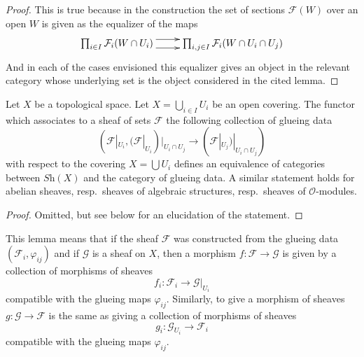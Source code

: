 \begin{proof}
This is true because in the construction the set of sections
$\mathcal{F}(W)$ over an open $W$ is given as the
equalizer of the maps
$$
\xymatrix{
\prod_{i \in I} \mathcal{F}_i(W \cap U_i)
\ar@<1ex>[r]
\ar@<-1ex>[r]
&
\prod_{i, j\in I} \mathcal{F}_i(W \cap U_i \cap U_j)
}
$$
And in each of the cases envisioned this equalizer gives
an object in the relevant category whose underlying set is
the object considered in the cited lemma.
\end{proof}

\begin{lemma}
\label{lemma-mapping-property-glue}
Let $X$ be a topological space.
Let $X = \bigcup_{i\in I} U_i$ be an open covering.
The functor which associates to a sheaf of
sets $\mathcal{F}$ the following collection of
glueing data
$$
(\mathcal{F}|_{U_i},
(\mathcal{F}|_{U_i})|_{U_i \cap U_j}
\to
(\mathcal{F}|_{U_j})|_{U_i \cap U_j}
)
$$
with respect to the covering $X = \bigcup U_i$
defines an equivalence of categories between
$\textit{Sh}(X)$ and the category of glueing
data. A similar statement holds for
abelian sheaves, resp.\ sheaves of algebraic structures,
resp.\ sheaves of $\mathcal{O}$-modules.
\end{lemma}

\begin{proof}
Omitted, but see below for an elucidation of the statement.
\end{proof}

\noindent
This lemma means that if the sheaf $\mathcal{F}$ was constructed
from the glueing data $(\mathcal{F}_i, \varphi_{ij})$
and if $\mathcal{G}$ is a sheaf on $X$, then a morphism
$f : \mathcal{F} \to \mathcal{G}$ is given by a collection of
morphisms of sheaves
$$
f_i : \mathcal{F}_i \longrightarrow \mathcal{G}|_{U_i}
$$
compatible with the glueing maps $\varphi_{ij}$. Similarly,
to give a morphism of sheaves $g : \mathcal{G} \to \mathcal{F}$
is the same as giving a collection of morphisms of sheaves
$$
g_i : \mathcal{G}_{U_i} \longrightarrow \mathcal{F}_i
$$
compatible with the glueing maps $\varphi_{ij}$.










